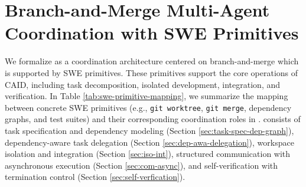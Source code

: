 \section{Branch-and-Merge Multi-Agent Coordination with SWE Primitives}
\label{sec:methods}

We formalize \ourmethod as a coordination architecture centered on branch-and-merge which is supported by SWE primitives. These primitives support the core operations of CAID, including task decomposition, isolated development, integration, and verification. In Table \ref{tab:swe-primitive-mapping}, we summarize the mapping between concrete SWE primitives (e.g., \texttt{git worktree}, \texttt{git merge}, dependency graphs, and test suites) and their corresponding coordination roles in \ourmethod.
\ourmethod consists of task specification and dependency modeling (Section \ref{sec:task-spec-dep-graph}), dependency-aware task delegation (Section \ref{sec:dep-awa-delegation}), workspace isolation and integration (Section \ref{sec:iso-int}), structured communication with asynchronous execution (Section \ref{sec:com-async}), and self-verification with termination control (Section \ref{sec:self-verfication}).

